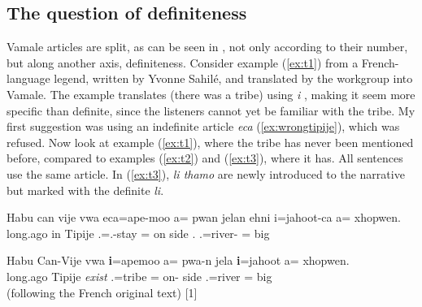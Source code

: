 \subsection{The question of definiteness}
\label{ssec:WCArt_specificity}
\begin{sloppypar}
Vamale articles are split, as can be seen in , not only according to their number, but along another axis, definiteness. 
Consider example (\ref{ex:t1}) from a French\hyp language legend, written by Yvonne Sahilé, and translated by the workgroup into Vamale. The example translates  (there was a tribe) using \textit{i} , making it seem more specific than definite, since the listeners cannot yet be familiar with the tribe. My first suggestion was using an indefinite article \textit{eca}  (\ref{ex:wrongtipije}), which was refused. %
Now look at example (\ref{ex:t1}), where the tribe has never been mentioned before, compared to examples (\ref{ex:t2}) and (\ref{ex:t3}), where it has. All sentences use the same article. In (\ref{ex:t3}), \textit{li thamo}  are newly introduced to the narrative but marked with the definite \textit{li}. %
\end{sloppypar}

\ea
\label{ex:wrongtipije}
\gll *Habu can vije vwa eca=ape-moo a= pwan jelan ehni i=jahoot-ca a= xhopwen.		\\
 long.ago in Tipije  .=.-stay = on side .  .=river- = big	\\
\z

\ea\label{ex:t1}
\gll 	Habu Can-Vije vwa \textbf{i}=apemoo a= pwa-n jela \textbf{i}=jahoot a= xhopwen.	\\
	long.ago Tipije \textit{exist} .=tribe = on- side .=river = big	\\
\glt  {} (following the French original text)	{[1]}	
\z

